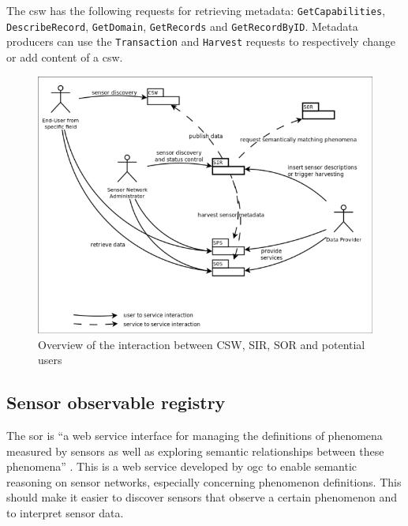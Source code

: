  \begin{sloppypar}
 The \ac{csw} has the following requests for retrieving metadata: \texttt{GetCapabilities},  \texttt{DescribeRecord}, \texttt{GetDomain}, \texttt{GetRecords} and \texttt{GetRecordByID}. Metadata producers can use the \texttt{Transaction} and \texttt{Harvest} requests to respectively change or add content of a \ac{csw}. 
\end{sloppypar}

\begin{figure}
	\centering
	\includegraphics[width=0.8\linewidth]{figs/sor_sir.png}
	\caption{Overview of the interaction between CSW, SIR, SOR and potential users \citep{SW:52North2}}
	\label{fig:SorSir}
\end{figure}

\subsection{Sensor observable registry}
The \ac{sor} is \enquote{a web service interface for managing the definitions of phenomena measured by sensors as well as exploring semantic relationships between these phenomena} \cite[p. vi]{SW:OGC4}. This is a web service developed by \ac{ogc} to enable semantic reasoning on sensor networks, especially concerning phenomenon definitions. This should make it easier to discover sensors that observe a certain phenomenon and to interpret sensor data.

